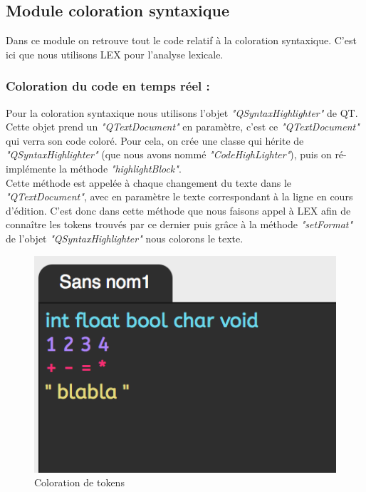 \documentclass[a4paper,12pt]{article}
\begin{document}
		\subsection{Module coloration syntaxique}	
		
		Dans ce module on retrouve tout le code relatif à la coloration syntaxique. C’est ici que nous utilisons LEX pour l’analyse lexicale.  
		
		\subsubsection*{Coloration du code en temps réel :}

	Pour la coloration syntaxique nous utilisons l’objet \textit{"QSyntaxHighlighter"} de QT. Cette objet prend un \textit{"QTextDocument"} en paramètre, c’est ce \textit{"QTextDocument"} qui verra son code coloré. Pour cela, on crée une classe qui hérite de \textit{"QSyntaxHighlighter"} (que nous avons nommé \textit{"CodeHighLighter"}), puis on ré-implémente la méthode \textit{"highlightBlock"}.\\
	 Cette méthode est appelée à chaque changement du texte dans le \textit{"QTextDocument"}, avec en paramètre le texte correspondant à la ligne en cours d’édition. C’est donc dans cette méthode que nous faisons appel à LEX afin de connaître les tokens trouvés par ce dernier puis grâce à la méthode \textit{"setFormat"} de l’objet \textit{"QSyntaxHighlighter"} nous colorons le texte.
	 
	 \begin{figure}[h!]
			\begin{center}
				\includegraphics[scale=1]{images/color}
				\caption{Coloration de tokens}
			\end{center}
		\end{figure}
		
\end{document}

